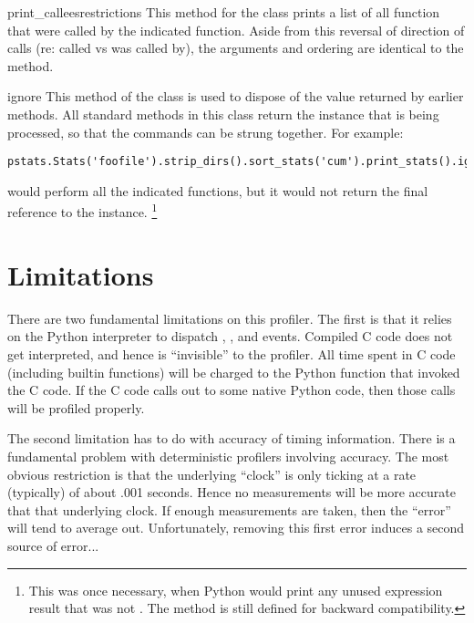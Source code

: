 \begin{funcdesc}{print_callees}{restrictions}
This method for the  class prints a list of all function
that were called by the indicated function.  Aside from this reversal
of direction of calls (re: called vs was called by), the arguments and
ordering are identical to the  method.
\end{funcdesc}

\begin{funcdesc}{ignore}{}
This method of the  class is used to dispose of the value
returned by earlier methods.  All standard methods in this class
return the instance that is being processed, so that the commands can
be strung together.  For example:

\begin{verbatim}
pstats.Stats('foofile').strip_dirs().sort_stats('cum').print_stats().ignore()
\end{verbatim}

would perform all the indicated functions, but it would not return
the final reference to the  instance.%
\footnote{
This was once necessary, when Python would print any unused expression
result that was not .  The method is still defined for
backward compatibility.
}
\end{funcdesc}


\section{Limitations}

There are two fundamental limitations on this profiler.  The first is
that it relies on the Python interpreter to dispatch ,
, and  events.  Compiled C code does not
get interpreted, and hence is ``invisible'' to the profiler.  All time
spent in C code (including builtin functions) will be charged to the
Python function that invoked the C code.  If the C code calls out
to some native Python code, then those calls will be profiled
properly.

The second limitation has to do with accuracy of timing information.
There is a fundamental problem with deterministic profilers involving
accuracy.  The most obvious restriction is that the underlying ``clock''
is only ticking at a rate (typically) of about .001 seconds.  Hence no
measurements will be more accurate that that underlying clock.  If
enough measurements are taken, then the ``error'' will tend to average
out. Unfortunately, removing this first error induces a second source
of error...

